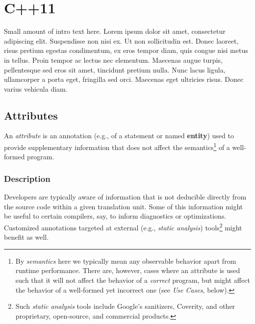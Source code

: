 \documentclass[twoside,10pt,letterpaper,usenames]{newstyle-PearsonGeneric-7-38}
\newcommand{\intraref}[1]{\textit{#1}}
\begin{document}





% 
% 
% 



\section[C++11]{C++11}\label{c++11}

Small amount of intro text here. Lorem ipsum dolor sit amet, consectetur
adipiscing elit. Suspendisse non nisi ex. Ut non sollicitudin est. Donec
laoreet, risus pretium egestas condimentum, ex eros tempor diam, quis
congue nisi metus in tellus. Proin tempor ac lectus nec elementum.
Maecenas augue turpis, pellentesque sed eros sit amet, tincidunt pretium
nulla. Nunc lacus ligula, ullamcorper a porta eget, fringilla sed orci.
Maecenas eget ultricies risus. Donec varius vehicula diam.

\subsection[Attributes]{Attributes}\label{attributes}

An \emph{attribute} is an annotation (e.g., of a statement or named
\textbf{entity}) used to provide supplementary information that does not
affect the semantics{\cprotect\footnote{By \emph{semantics} here we
typically mean any observable behavior apart from runtime performance.
There are, however, cases where an attribute is used such that it will
not affect the behavior of a \emph{correct} program, but might affect
the behavior of a well-formed yet incorrect one (see {\intraref{{Use
Cases}}}, below).}} of a well-formed program.

\subsubsection[Description]{Description}\label{description}

Developers are typically aware of information that is not deducible
directly from the source code within a given translation unit. Some of
this information might be useful to certain compilers, say, to inform
diagnostics or optimizations. Customized annotations targeted at
external (e.g., \emph{static analysis}) tools{\cprotect\footnote{Such
\emph{static analysis} tools include Google's sanitizers, Coverity,
and other proprietary, open-source, and commercial products.}} might
benefit as well.
\end{document}
